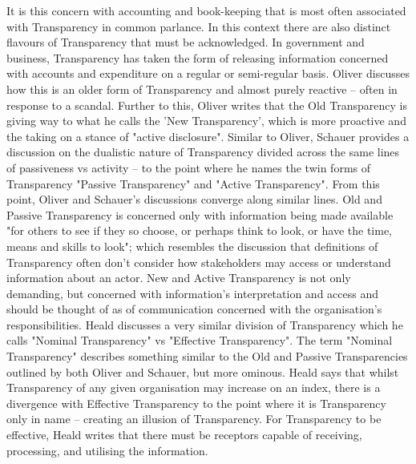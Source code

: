 It is this concern with accounting and book-keeping that is most often associated with Transparency in common parlance. In this context there are also distinct flavours of Transparency that must be acknowledged. In government and business, Transparency has taken the form of releasing information concerned with accounts and expenditure on a regular or semi-regular basis. Oliver discusses how this is an older form of Transparency and almost purely reactive -- often in response to a scandal. Further to this, Oliver writes that the Old Transparency is giving way to what he calls the 'New Transparency', which is more proactive and the taking on a stance of "active disclosure". Similar to Oliver, Schauer provides a discussion on the dualistic nature of Transparency divided across the same lines of passiveness vs activity -- to the point where he names the twin forms of Transparency "Passive Transparency" and "Active Transparency". From this point, Oliver and Schauer's discussions converge along similar lines. Old and Passive Transparency is concerned only with information being made available "for others to see if they so choose, or perhaps think to look, or have the time, means and skills to look"; which resembles the discussion that definitions of Transparency often don't consider how stakeholders may access or understand information about an actor. New and Active Transparency is not only demanding, but concerned with information's interpretation and access and should be thought of as of communication concerned with the organisation's responsibilities. Heald discusses a very similar division of Transparency which he calls "Nominal Transparency" vs "Effective Transparency". The term "Nominal Transparency" describes something similar to the Old and Passive Transparencies outlined by both Oliver and Schauer, but more ominous. Heald says that whilst Transparency of any given organisation may increase on an index, there is a divergence with Effective Transparency to the point where it is Transparency only in name -- creating an illusion of Transparency. For Transparency to be effective, Heald writes that there must be receptors capable of receiving, processing, and utilising the information.

